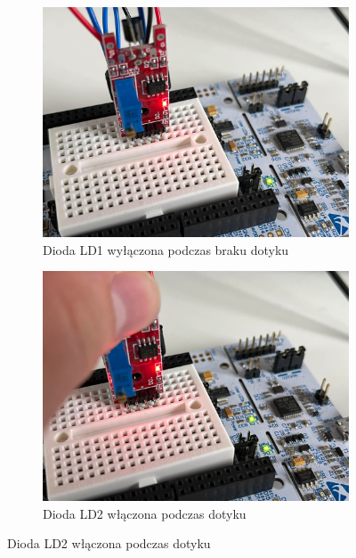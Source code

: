 \documentclass[11pt, a4paper]{article}
\begin{document}
\vspace{0.25cm}
\begin{figure}[h]
\centering
\begin{subfigure}{.5\textwidth}
\centering
\includegraphics[width=.9\linewidth]{fig/KY-036/284806248_540548144336070_8978676119647820502_n}
\caption{Dioda LD1 wyłączona podczas braku dotyku}
\label{fig:_układ_mikroproc_dioda_wyl}
\end{subfigure}%
\begin{subfigure}{.5\textwidth}
\centering
\includegraphics[width=.9\linewidth]{fig/KY-036/281840585_380019084156582_1310010852558564635_n}
\caption{Dioda LD2 włączona podczas dotyku}
\label{fig:_układ_mikroproc_dioda_wla}
\end{subfigure}
\label{fig:mikroproc}
\end{figure}
\vspace{0.25cm}
\end{document}

